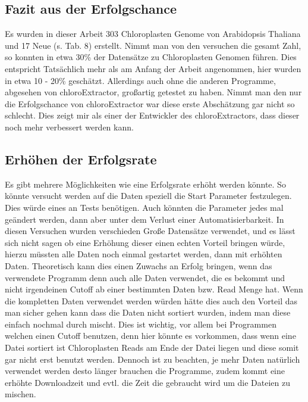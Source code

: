 \documentclass{scrartcl}
\begin{document}
\subsection{Fazit aus der Erfolgschance}
\label{sec-5-3}
Es wurden in dieser Arbeit 303 Chloroplasten Genome von Arabidopsis Thaliana und 17 Neue (s. Tab. 8) erstellt. Nimmt man von den versuchen die gesamt Zahl, so konnten in etwa 30\% der Datensätze zu Chloroplasten Genomen führen.
Dies entspricht Tatsächlich mehr als am Anfang der Arbeit angenommen, hier wurden in etwa 10 - 20\% geschätzt. Allerdings auch ohne die anderen Programme, abgesehen von chloroExtractor, großartig getestet zu haben. Nimmt man 
den nur die Erfolgschance von chloroExtractor war diese erste Abschätzung gar nicht so schlecht. Dies zeigt mir als einer der Entwickler des chloroExtractors, dass dieser noch mehr verbessert werden kann.  
\subsection{Erhöhen der Erfolgsrate}
\label{sec-5-4}
Es gibt mehrere Möglichkeiten wie eine Erfolgsrate erhöht werden könnte. So könnte versucht werden auf die Daten speziell die Start Parameter festzulegen. Dies würde eines an Tests benötigen. Auch könnten die Parameter jedes mal 
geändert werden, dann aber unter dem Verlust einer Automatisierbarkeit. In diesen Versuchen wurden verschieden Große Datensätze verwendet, und es lässt sich nicht sagen ob eine Erhöhung dieser einen echten Vorteil bringen würde, 
hierzu müssten alle Daten noch einmal gestartet werden, dann mit erhöhten Daten. Theoretisch kann dies einen Zuwachs an Erfolg bringen, wenn das verwendete Programm denn auch alle Daten verwendet, die es bekommt und nicht
irgendeinen Cutoff ab einer bestimmten Daten bzw. Read Menge hat. Wenn die kompletten Daten verwendet werden würden hätte dies auch den Vorteil das man sicher gehen kann dass die Daten nicht sortiert wurden, indem man diese
einfach nochmal durch mischt. Dies ist wichtig, vor allem bei Programmen welchen einen Cutoff benutzen, denn hier könnte es vorkommen, dass wenn eine Datei sortiert ist Chloroplasten Reads am Ende der Datei liegen und diese somit
gar nicht erst benutzt werden. Dennoch ist zu beachten, je mehr Daten natürlich verwendet werden desto länger brauchen die Programme, zudem kommt eine erhöhte Downloadzeit und evtl. die Zeit die gebraucht wird um die Dateien zu 
mischen. 
\end{document}
